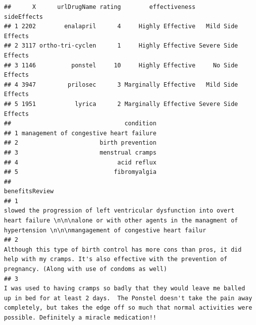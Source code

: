 \documentclass[spanish,]{article}
\begin{document}
\begin{verbatim}
##      X      urlDrugName rating        effectiveness         sideEffects
## 1 2202        enalapril      4     Highly Effective   Mild Side Effects
## 2 3117 ortho-tri-cyclen      1     Highly Effective Severe Side Effects
## 3 1146          ponstel     10     Highly Effective     No Side Effects
## 4 3947         prilosec      3 Marginally Effective   Mild Side Effects
## 5 1951           lyrica      2 Marginally Effective Severe Side Effects
##                                condition
## 1 management of congestive heart failure
## 2                       birth prevention
## 3                       menstrual cramps
## 4                            acid reflux
## 5                           fibromyalgia
##                                                                                                                                                                                                                                                                                                                                                                                                                                                                                                                                                                                                           benefitsReview
## 1                                                                                                                                                                                                                                                                                                                                                                                                                         slowed the progression of left ventricular dysfunction into overt heart failure \n\n\nalone or with other agents in the managment of hypertension \n\n\nmangagement of congestive heart failur
## 2                                                                                                                                                                                                                                                                                                                                                                                                                                     Although this type of birth control has more cons than pros, it did help with my cramps. It's also effective with the prevention of pregnancy. (Along with use of condoms as well)
## 3                                                                                                                                                                                                                                                                                                                                                         I was used to having cramps so badly that they would leave me balled up in bed for at least 2 days.  The Ponstel doesn't take the pain away completely, but takes the edge off so much that normal activities were possible. Definitely a miracle medication!!

\end{verbatim}
\end{document}
